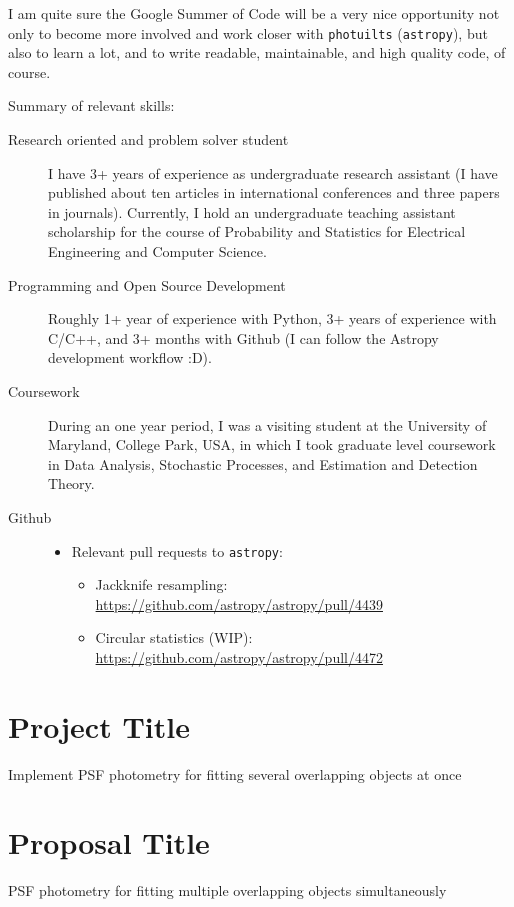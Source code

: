 \documentclass[11pt]{article}
\begin{document}
I am quite sure the Google Summer of Code will be a very nice opportunity not only to become more involved and work closer with \texttt{photuilts} (\texttt{astropy}), but also to learn a lot, and to write readable, maintainable, and high quality code, of course. 

Summary of relevant skills: 
\begin{description}
    \item[Research oriented and problem solver student] I have 3+ years of experience as undergraduate research assistant (I have published about ten articles in international conferences and three papers in journals). Currently, I hold an undergraduate teaching assistant scholarship for the course of Probability and Statistics for Electrical Engineering and Computer Science.
    \item [Programming and Open Source Development] Roughly 1+ year of experience with Python, 3+ years of experience with C/C++, and 3+ months with Github (I can follow the Astropy development workflow :D).
    \item [Coursework] During an one year period, I was a visiting student at the University of Maryland, College Park, USA, in which I took graduate level coursework in Data Analysis, Stochastic Processes, and Estimation and Detection Theory. 
    \item [Github]
        \begin{itemize}
            \item Relevant pull requests to \texttt{astropy}:
                \begin{itemize}
                    \item Jackknife resampling: \url{https://github.com/astropy/astropy/pull/4439}
                    \item Circular statistics (WIP): \url{https://github.com/astropy/astropy/pull/4472}
                \end{itemize}
        \end{itemize}
\end{description}

\section{Project Title}
Implement PSF photometry for fitting several overlapping objects at once

\section{Proposal Title}
PSF photometry for fitting multiple overlapping objects simultaneously
\end{document}
